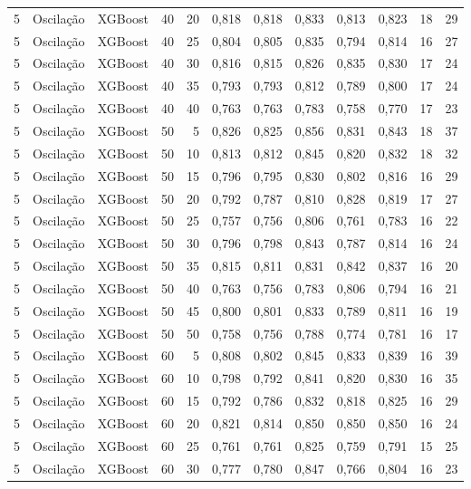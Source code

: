 \begin{longtable}{ccclrrrrrrrr}
5 & Oscilação & XGBoost & 40 & 20 & 0,818 & 0,818 & 0,833 & 0,813 & 0,823 & 18 & 29 \\
5 & Oscilação & XGBoost & 40 & 25 & 0,804 & 0,805 & 0,835 & 0,794 & 0,814 & 16 & 27 \\
5 & Oscilação & XGBoost & 40 & 30 & 0,816 & 0,815 & 0,826 & 0,835 & 0,830 & 17 & 24 \\
5 & Oscilação & XGBoost & 40 & 35 & 0,793 & 0,793 & 0,812 & 0,789 & 0,800 & 17 & 24 \\
5 & Oscilação & XGBoost & 40 & 40 & 0,763 & 0,763 & 0,783 & 0,758 & 0,770 & 17 & 23 \\
5 & Oscilação & XGBoost & 50 & 5 & 0,826 & 0,825 & 0,856 & 0,831 & 0,843 & 18 & 37 \\
5 & Oscilação & XGBoost & 50 & 10 & 0,813 & 0,812 & 0,845 & 0,820 & 0,832 & 18 & 32 \\
5 & Oscilação & XGBoost & 50 & 15 & 0,796 & 0,795 & 0,830 & 0,802 & 0,816 & 16 & 29 \\
5 & Oscilação & XGBoost & 50 & 20 & 0,792 & 0,787 & 0,810 & 0,828 & 0,819 & 17 & 27 \\
5 & Oscilação & XGBoost & 50 & 25 & 0,757 & 0,756 & 0,806 & 0,761 & 0,783 & 16 & 22 \\
5 & Oscilação & XGBoost & 50 & 30 & 0,796 & 0,798 & 0,843 & 0,787 & 0,814 & 16 & 24 \\
5 & Oscilação & XGBoost & 50 & 35 & 0,815 & 0,811 & 0,831 & 0,842 & 0,837 & 16 & 20 \\
5 & Oscilação & XGBoost & 50 & 40 & 0,763 & 0,756 & 0,783 & 0,806 & 0,794 & 16 & 21 \\
5 & Oscilação & XGBoost & 50 & 45 & 0,800 & 0,801 & 0,833 & 0,789 & 0,811 & 16 & 19 \\
5 & Oscilação & XGBoost & 50 & 50 & 0,758 & 0,756 & 0,788 & 0,774 & 0,781 & 16 & 17 \\
5 & Oscilação & XGBoost & 60 & 5 & 0,808 & 0,802 & 0,845 & 0,833 & 0,839 & 16 & 39 \\
5 & Oscilação & XGBoost & 60 & 10 & 0,798 & 0,792 & 0,841 & 0,820 & 0,830 & 16 & 35 \\
5 & Oscilação & XGBoost & 60 & 15 & 0,792 & 0,786 & 0,832 & 0,818 & 0,825 & 16 & 29 \\
5 & Oscilação & XGBoost & 60 & 20 & 0,821 & 0,814 & 0,850 & 0,850 & 0,850 & 16 & 24 \\
5 & Oscilação & XGBoost & 60 & 25 & 0,761 & 0,761 & 0,825 & 0,759 & 0,791 & 15 & 25 \\
5 & Oscilação & XGBoost & 60 & 30 & 0,777 & 0,780 & 0,847 & 0,766 & 0,804 & 16 & 23 \\

\end{longtable}
